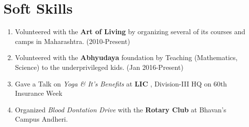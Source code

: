 \documentclass[10pt,a4paper,sans]{moderncv} %
\begin{document}


\section{Soft Skills}
\begin{enumerate}
\item Volunteered with the\textbf{ Art of Living} by organizing several of its courses and camps in Maharashtra.        (2010-Present) 
\item Volunteered with the \textbf{Abhyudaya} foundation by Teaching (Mathematics, Science) to the underprivileged kids. (Jan 2016-Present) 
\item Gave a Talk on \textit{Yoga \& It's Benefits} at \textbf{LIC }, Division-III HQ on 60th Insurance Week 
\item Organized \textit{Blood Dontation Drive} with the \textbf{Rotary Club} at Bhavan's Campus Andheri.
\end{enumerate}
\end{document}
